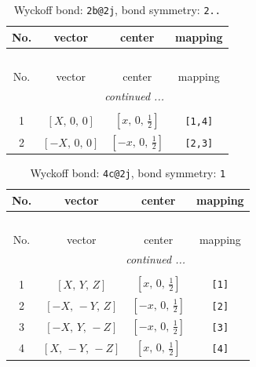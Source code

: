 \documentclass[fleqn,8pt]{jsarticle}
\begin{document}
\renewcommand{\arraystretch}{1.2}
\begin{longtable}{cccc}
\caption{Wyckoff bond: {\tt 2b@2j}, bond symmetry: {\tt 2..}}
 \\
 \hline \hline
No. & vector & center & mapping \\ \hline \endfirsthead

\multicolumn{3}{l}{\tablename\ \thetable{}} \\
 \hline \hline
No. & vector & center & mapping \\ \hline \endhead

 \hline \hline
\multicolumn{3}{r}{\footnotesize\it continued ...} \\ \endfoot

 \hline \hline
\multicolumn{3}{r}{} \\ \endlastfoot

1 & $\left[ X,\, 0,\, 0 \right]$ & $\left[ x,\, 0,\, \frac{1}{2} \right]$ & {\tt [1,4]} \\ \hline
2 & $\left[ - X,\, 0,\, 0 \right]$ & $\left[ - x,\, 0,\, \frac{1}{2} \right]$ & {\tt [2,3]} \\
\end{longtable}
\renewcommand{\arraystretch}{1.2}
\begin{longtable}{cccc}
\caption{Wyckoff bond: {\tt 4c@2j}, bond symmetry: {\tt 1}}
 \\
 \hline \hline
No. & vector & center & mapping \\ \hline \endfirsthead

\multicolumn{3}{l}{\tablename\ \thetable{}} \\
 \hline \hline
No. & vector & center & mapping \\ \hline \endhead

 \hline \hline
\multicolumn{3}{r}{\footnotesize\it continued ...} \\ \endfoot

 \hline \hline
\multicolumn{3}{r}{} \\ \endlastfoot

1 & $\left[ X,\, Y,\, Z \right]$ & $\left[ x,\, 0,\, \frac{1}{2} \right]$ & {\tt [1]} \\ \hline
2 & $\left[ - X,\, - Y,\, Z \right]$ & $\left[ - x,\, 0,\, \frac{1}{2} \right]$ & {\tt [2]} \\ \hline
3 & $\left[ - X,\, Y,\, - Z \right]$ & $\left[ - x,\, 0,\, \frac{1}{2} \right]$ & {\tt [3]} \\ \hline
4 & $\left[ X,\, - Y,\, - Z \right]$ & $\left[ x,\, 0,\, \frac{1}{2} \right]$ & {\tt [4]} \\
\end{longtable}
\end{document}
